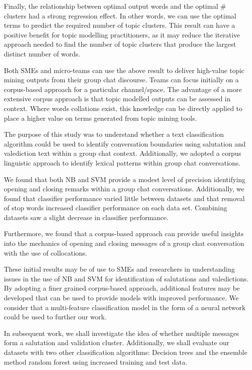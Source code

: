 Finally, the relationship between optimal output words and the optimal \# clusters had a strong regression effect. In other words, we can use the optimal terms to predict the required number of topic clusters. This result can have a positive benefit for topic modelling practitioners, as it may reduce the iterative approach needed to find the number of topic clusters that produce the largest distinct number of words.

Both SMEs and micro-teams can use the above result to deliver high-value topic mining outputs from their group chat discourse. Teams can focus initially on a corpus-based approach for a particular channel/space. The advantage of a more extensive corpus approach is that topic modelled outputs can be assessed in context. Where words collations exist, this knowledge can be directly applied to place a higher value on terms generated from topic mining tools.


The purpose of this study was to understand whether a text classification algorithm could be used to identify conversation boundaries using salutation and valediction text within a group chat context. Additionally, we adopted a corpus linguistic approach to identify lexical patterns within group chat conversations.  

We found that both NB and SVM provide a modest level of precision identifying opening and closing remarks within a group chat conversations. Additionally, we found that classifier performance varied little between datasets and that removal of stop words increased classifier performance on each data set. Combining datasets saw a slight decrease in classifier performance.

Furthermore, we found that a corpus-based approach can provide useful insights into the mechanics of opening and closing messages of a group chat conversation with the use of collocations. 

These initial results may be of use to SMEs and researchers in understanding issues in the use of NB and SVM for identification of salutations and valedictions. By adopting a finer grained corpus-based approach, additional features may be developed that can be used to provide models with improved performance. We consider that a multi-feature classification model in the form of a neural network could be used to further our work.

In subsequent work, we shall investigate the idea of whether multiple messages form a salutation and validation cluster. Additionally, we shall evaluate our datasets with two other classification algorithms: Decision trees and the ensemble method random forest using increased training and test data.


